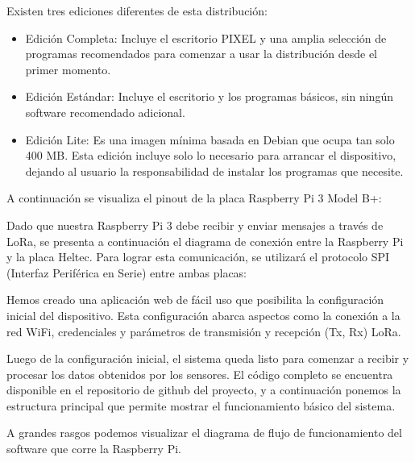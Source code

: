Existen tres ediciones diferentes de esta distribución:

\begin{itemize}
    \item Edición Completa: Incluye el escritorio PIXEL y una amplia selección de programas recomendados para comenzar a usar la distribución desde el primer momento.
    \item Edición Estándar: Incluye el escritorio y los programas básicos, sin ningún software recomendado adicional.
    \item Edición Lite: Es una imagen mínima basada en Debian que ocupa tan solo 400 MB. Esta edición incluye solo lo necesario para arrancar el dispositivo, dejando al usuario la responsabilidad de instalar los programas que necesite.
\end{itemize}

A continuación se visualiza el pinout de la placa Raspberry Pi 3 Model B+:


Dado que nuestra Raspberry Pi 3 debe recibir y enviar mensajes a través de LoRa, se presenta a continuación el diagrama de conexión entre la Raspberry Pi y la placa Heltec. Para lograr esta comunicación, se utilizará el protocolo SPI (Interfaz Periférica en Serie) entre ambas placas:


Hemos creado una aplicación web de fácil uso que posibilita la configuración inicial del dispositivo. Esta configuración abarca aspectos como la conexión a la red WiFi, credenciales y parámetros de transmisión y recepción (Tx, Rx) LoRa.

Luego de la configuración inicial, el sistema queda listo para comenzar a recibir y procesar los datos obtenidos por los sensores. El código completo se encuentra disponible en el repositorio de github del proyecto, y a continuación ponemos la estructura principal que permite mostrar el funcionamiento básico del sistema.

A grandes rasgos podemos visualizar el diagrama de flujo de funcionamiento del software que corre la Raspberry Pi.

